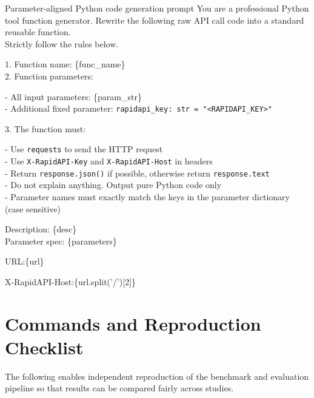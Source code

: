 \begin{promptcard}{Parameter-aligned Python code generation prompt}
You are a professional Python tool function generator. Rewrite the following raw API call code into a standard reusable function.\\
Strictly follow the rules below.\par

1. Function name: \{func\_name\}\\
2. Function parameters:\par
- All input parameters: \{param\_str\}\\
- Additional fixed parameter: \texttt{rapidapi\_key: str = "<RAPIDAPI\_KEY>"}\par
3. The function must:\par
- Use \texttt{requests} to send the HTTP request\\
- Use \texttt{X-RapidAPI-Key} and \texttt{X-RapidAPI-Host} in headers\\
- Return \texttt{response.json()} if possible, otherwise return \texttt{response.text}\\
- Do not explain anything. Output pure Python code only\\
- Parameter names must exactly match the keys in the parameter dictionary (case sensitive)\par

Description: \{desc\}\\
Parameter spec: \{parameters\}\par
URL:\{url\}\par
X-RapidAPI-Host:\{url.split('/')[2]\}\par

\end{promptcard}


\section{Commands and Reproduction Checklist}
\label{sec:commands}

The following enables independent reproduction of the benchmark and evaluation pipeline so that results can be compared fairly across studies.

